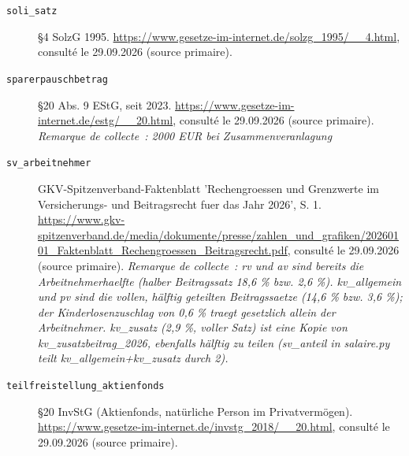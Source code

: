 \begin{description}
\item[\texttt{soli\_satz}] \label{src:soli_satz} §4 SolzG 1995. \url{https://www.gesetze-im-internet.de/solzg_1995/__4.html}, consulté le 29.09.2026 (source primaire).
\item[\texttt{sparerpauschbetrag}] \label{src:sparerpauschbetrag} §20 Abs. 9 EStG, seit 2023. \url{https://www.gesetze-im-internet.de/estg/__20.html}, consulté le 29.09.2026 (source primaire). \textit{Remarque de collecte~: 2000 EUR bei Zusammenveranlagung}
\item[\texttt{sv\_arbeitnehmer}] \label{src:sv_arbeitnehmer} GKV-Spitzenverband-Faktenblatt 'Rechengroessen und Grenzwerte im Versicherungs- und Beitragsrecht fuer das Jahr 2026', S. 1. \url{https://www.gkv-spitzenverband.de/media/dokumente/presse/zahlen_und_grafiken/20260101_Faktenblatt_Rechengroessen_Beitragsrecht.pdf}, consulté le 29.09.2026 (source primaire). \textit{Remarque de collecte~: rv und av sind bereits die Arbeitnehmerhaelfte (halber Beitragssatz 18,6 \% bzw. 2,6 \%). kv\_allgemein und pv sind die vollen, hälftig geteilten Beitragssaetze (14,6 \% bzw. 3,6 \%); der Kinderlosenzuschlag von 0,6 \% traegt gesetzlich allein der Arbeitnehmer. kv\_zusatz (2,9 \%, voller Satz) ist eine Kopie von kv\_zusatzbeitrag\_2026, ebenfalls hälftig zu teilen (sv\_anteil in salaire.py teilt kv\_allgemein+kv\_zusatz durch 2).}
\item[\texttt{teilfreistellung\_aktienfonds}] \label{src:teilfreistellung_aktienfonds} §20 InvStG (Aktienfonds, natürliche Person im Privatvermögen). \url{https://www.gesetze-im-internet.de/invstg_2018/__20.html}, consulté le 29.09.2026 (source primaire).
\end{description}
